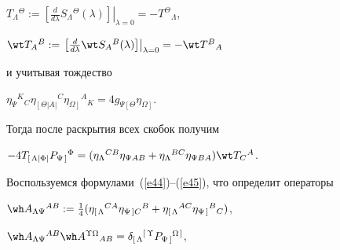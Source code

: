 

$T_\Lambda{}^\Theta:=\left.\left[


\frac{d}{d\lambda}S_\Lambda{}^\Theta(\lambda)


\right]\right|_{\lambda=0}=-T^\Theta{}_\Lambda$,


$\wt T_A{}^B:=\left.\left[


\frac{d}{d\lambda}\wt S_A{}^B(\lambda)


\right]\right|_{\lambda=0}=-\wt T^B{}_A$




и учитывая тождество




$\eta_\Psi{}^K{}_C\eta_{\left[\right.\Theta


|A|}{}^C\eta_{\Omega\left.\right]}{}^A{}_K=


4g_{\Psi\left[\right.\Theta}\eta_{\Omega\left.\right]}$.




Тогда после раскрытия всех скобок получим




$-4T_{\left[\right.\Lambda|\Phi |}P_{\Psi\left.\right]}{}^\Phi=


(\eta_\Lambda{}^{CB}\eta_{\Psi AB}+


\eta_\Lambda{}^{BC}\eta_{\Psi BA})\wt T_C{}^A$.




Воспользуемся формулами~(\ref{e44})--(\ref{e45}), что определит операторы




$\wh A_{\Lambda\Psi}{}^{AB}:=\frac{1}{4}


(\eta_{\left[\right.\Lambda}{}^{CA}\eta_{\Psi\left.\right]C}{}^B+


\eta_{\left[\right.\Lambda}{}^{AC}\eta_{\Psi\left.\right]}{}^B{}_C)$,


$\wh A_{\Lambda\Psi}{}^{AB}\wh A^{\Upsilon\Omega}{}_{AB}=


\delta_{\left[\right.\Lambda}{}^{\left[\right.\Upsilon}


P_{\Psi\left.\right]}{}^{\Omega\left.\right]}$,


